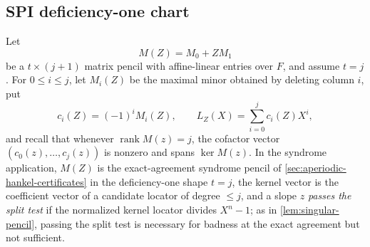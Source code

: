 \subsection{SPI deficiency-one chart}

Let
\[
        M(Z)=M_0+ZM_1
\]
be a $t\times(j+1)$ matrix pencil with affine-linear entries over $F$, and assume $t=j$.  For $0\le i\le j$, let $M_i(Z)$ be the maximal minor obtained by deleting column $i$, put
\[
        c_i(Z)=(-1)^iM_i(Z),
        \qquad
        L_Z(X)=\sum_{i=0}^{j}c_i(Z)X^i,
\]
and recall that whenever $\operatorname{rank}M(z)=j$, the cofactor vector $(c_0(z),\ldots,c_j(z))$ is nonzero and spans $\ker M(z)$.  In the syndrome application, $M(Z)$ is the exact-agreement syndrome pencil of \cref{sec:aperiodic-hankel-certificates} in the deficiency-one shape $t=j$, the kernel vector is the coefficient vector of a candidate locator of degree $\le j$, and a slope $z$ \emph{passes the split test} if the normalized kernel locator divides $X^n-1$; as in \cref{lem:singular-pencil}, passing the split test is necessary for badness at the exact agreement but not sufficient.

